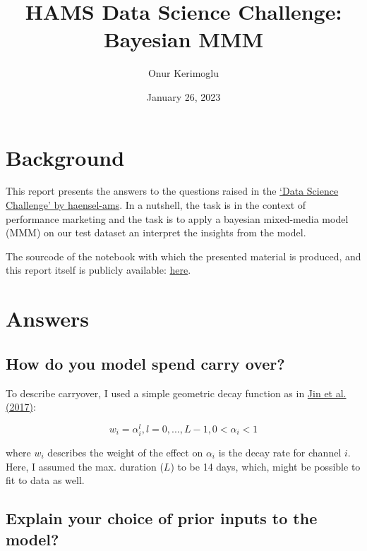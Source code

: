 \documentclass[a4paper,10pt]{scrartcl}
\title{HAMS Data Science Challenge: Bayesian MMM}
\author{Onur Kerimoglu}
\date{January 26, 2023}
\begin{document}
\maketitle

\section{Background}
This report presents the answers to the questions raised in the \href{https://github.com/haensel-ams/recruitment_challenge/tree/master/DataScience_202209}{`Data Science Challenge' by haensel-ams}. In a nutshell, the task is in the context of performance marketing and the task is to apply a bayesian mixed-media model (MMM) on our test dataset an interpret the insights from the model.

The sourcode of the notebook with which the presented material is produced, and this report itself is publicly available: \href{https://github.com/OnurKerimoglu/bayesian_mmm}{here}.

\section{Answers}

\subsection{How do you model spend carry over?}

To describe carryover, I used a simple geometric decay function as in \href{https://static.googleusercontent.com/media/research.google.com/en//pubs/archive/46001.pdf}{Jin et al. (2017)}:

\begin{equation}\label{eq:carryover}
 w_i = \alpha_i^l, l=0,...,L-1, 0<\alpha_i<1
\end{equation}

where $w_i$ describes the weight of the effect on   $\alpha_i$ is the decay rate for channel $i$. Here, I assumed the max. duration ($L$) to be 14 days, which, might be possible to fit to data as well.

\subsection {Explain your choice of prior inputs to the model?}
\end{document}
